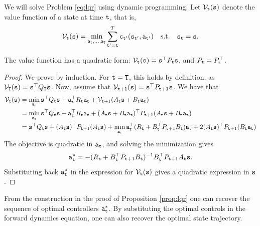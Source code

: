 We will solve Problem \ref{eq:lqr} using dynamic programming. Let $\mathcal{V}_{\tt t}({\tt s})$ denote the value function of a state at time ${\tt t}$, that is, 
$$\mathcal{V}_{\tt t}({\tt s}) = \min_{{\tt a}_{\tt t},\dots,{\tt a}_{\tt T}} \sum_{{\tt t}'={\tt t}}^T {\tt c}_{{\tt t}'}({\tt s}_{{\tt t}'}, {\tt a}_{{\tt t}'}) \quad \textrm{s.t.} \quad {\tt s}_{\tt t} = {\tt s}.$$

\begin{proposition}\label{prop:lqr}
The value function has a quadratic form: $\mathcal{V}_{\tt t}({\tt s}) = {\tt s}^\top P_{\tt t} {\tt s}$, and $P_{\tt t}=P_{\tt t}^\top$. 
\end{proposition}
\begin{proof}
We prove by induction. For ${\tt t}={\tt T}$, this holds by definition, as $\mathcal{V}_{\tt T}({\tt s}) = {\tt s}^\top Q_{\tt T} {\tt s}$. Now, assume that $\mathcal{V}_{{\tt t}+1}({\tt s}) = {\tt s}^\top P_{{\tt t}+1} {\tt s}$. We have that 
\begin{equation*}
\begin{split}
        \mathcal{V}_{\tt t}({\tt s}) &= \min_{{\tt a}_{\tt t}} {\tt s}^\top Q_{\tt t} {\tt s} + {\tt a}_{\tt t}^\top R_{\tt t} {\tt a}_{\tt t} + \mathcal{V}_{{\tt t}+1}(A_{\tt t} {\tt s} + B_{\tt t} {\tt a}_{\tt t}) \\
        &= \min_{{\tt a}_{\tt t}} {\tt s}^\top Q_{\tt t} {\tt s} + {\tt a}_{\tt t}^\top R_{\tt t} {\tt a}_{\tt t} + (A_{\tt t} {\tt s} + B_{\tt t} {\tt a}_{\tt t})^\top P_{{\tt t}+1} (A_{\tt t} {\tt s} + B_{\tt t} {\tt a}_{\tt t}) \\
        &= {\tt s}^\top Q_{\tt t} {\tt s} + (A_{\tt t} {\tt s})^\top P_{{\tt t}+1} (A_{\tt t} {\tt s}) + \min_{{\tt a}_{\tt t}} {\tt a}_{\tt t}^\top (R_{\tt t} + B_{\tt t}^\top P_{{\tt t}+1} B_{\tt t}) {\tt a}_{\tt t} + 2(A_{\tt t} {\tt s})^\top P_{{\tt t}+1} (B_{\tt t} {\tt a}_{\tt t})
\end{split}
\end{equation*}
The objective is quadratic in ${\tt a}_{\tt t}$, and solving the minimization gives 
$${\tt a}_{\tt t}^* = -(R_{\tt t} + B_{\tt t}^\top P_{{\tt t}+1} B_{\tt t})^{-1} B_{\tt t}^\top P_{{\tt t}+1} A_{\tt t} {\tt s}. $$ 
Substituting back ${\tt a}_{\tt t}^*$ in the expression for $\mathcal{V}_{\tt t}({\tt s})$ gives a quadratic expression in ${\tt s}$.
\end{proof}

From the construction in the proof of Proposition \ref{prop:lqr} one can recover the sequence of optimal controllers ${\tt a}_{\tt t}^*$. By substituting the optimal controls in the forward dynamics equation, one can also recover the optimal state trajectory.

